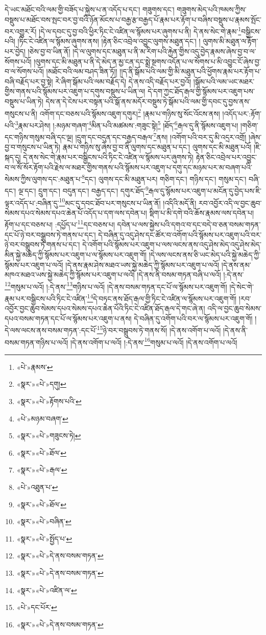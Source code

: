 དེ་ཡང་མཐོང་བའི་ལམ་གྱི་བཟོད་པ་སྐྱེས་པ་ན་འདོད་པ་དང་། གཟུགས་དང་། གཟུགས་མེད་པའི་ཁམས་ཀྱིས་བསྡུས་པ་མཐོང་བས་སྤང་བར་བྱ་བའི་ཉོན་མོངས་པ་བརྒྱ་རྩ་བརྒྱད་པོ་རྣམ་པར་རྟོག་པ་བཞིས་བསྡུས་པ་རྣམས་སྤོང་བར་འགྱུར་རོ། །དེ་ལ་དབང་དུ་བྱ་བའི་ཕྱིར་ཏིང་ངེ་འཛིན་ལ་སྙོམས་པར་ཞུགས་པ་ནི། དེ་ནས་སེང་གེ་རྣམ་\footnote{«པེ་»རྣམས་}བསྒྱིངས་པའི། །ཏིང་ངེ་འཛིན་ལ་སྙོམས་ཞུགས་ནས། །རྟེན་ཅིང་འབྲེལ་འབྱུང་ལུགས་མཐུན་དང་། །
ལུགས་མི་མཐུན་ལ་རྟོག་པར་བྱེད། །ཅེས་བྱ་བ་ཡིན་ནོ། །དེ་ལ་ལུགས་དང་མཐུན་པ་ནི་མ་རིག་པའི་རྐྱེན་གྱིས་འདུ་བྱེད་རྣམས་ཞེས་བྱ་བ་ལ་སོགས་པའོ། །ལུགས་དང་མི་མཐུན་པ་ནི་དེ་མེད་ན་མྱ་ངན་དང་སྨྲེ་སྔགས་འདོན་པ་ལ་སོགས་པ་མི་འབྱུང་ངོ་ཞེས་བྱ་བ་ལ་སོགས་པའོ། །མཐོང་བའི་ལམ་བཤད་ཟིན་ཏོ།། །།ད་ནི་སྒོམ་པའི་ལམ་གྱི་མི་མཐུན་པའི་ཕྱོགས་རྣམ་པར་རྟོག་པ་བཞི་བརྗོད་པར་བྱ་སྟེ། རེ་ཞིག་སྒོམ་པའི་ལམ་བརྗོད་དེ། དེ་ནས་འདི་བརྗོད་པར་བྱའོ། །སྒོམ་པའི་ལམ་ཡང་མཐར་གྱིས་གནས་པའི་སྙོམས་པར་འཇུག་པ་དགུས་བསྡུས་པ་ཡིན་ལ། དེ་དག་ཀྱང་ཐོད་རྒལ་གྱི་སྙོམས་པར་འཇུག་པས་བསྡུས་པ་ཡིན་ཏེ། དེས་ན་དེ་ངེས་པར་བསྟན་པའི་སྒོ་ནས་མདོར་བསྡུས་ཏེ་སྒོམ་པའི་ལམ་གྱི་དབང་དུ་བྱས་ནས་གསུངས་པ་ནི། འགོག་དང་བཅས་པའི་སྙོམས་འཇུག་དགུར།\footnote{«སྣར་»«པེ་»དགུ།} །རྣམ་པ་གཉིས་སུ་སོང་འོངས་ནས། །འདོད་པར་:རྟོག་པའི་\footnote{«སྣར་»«པེ་»རྟོགས་པའི་}རྣམ་པར་ཤེས། །:མཉམ་གཞག་\footnote{«པེ་»མཉམ་བཞག་}མིན་པའི་མཚམས་:གཟུང་སྟེ།\footnote{«སྣར་»«པེ་»གཟུངས་ཏེ།} །ཐོད་\footnote{«སྣར་»«པེ་»ཐོལ་}རྒལ་དུ་ནི་སྙོམས་འཇུག་པ། །གཅིག་དང་གཉིས་གསུམ་བཞི་དང་ལྔ། །དྲུག་དང་བདུན་དང་བརྒྱད་བརྒལ་\footnote{«སྣར་»«པེ་»རྒལ་}ནས། །འགོག་པའི་བར་དུ་མི་འདྲར་འགྲོ། །ཞེས་བྱ་བ་གསུངས་པ་ཡིན་ཏེ། རྣམ་པ་གཉིས་སུ་ཞེས་བྱ་བ་ནི་ལུགས་དང་མཐུན་པ་དང་། ལུགས་དང་མི་མཐུན་པའོ། །ཇི་སྐད་དུ། དེ་ནས་སེང་གེ་རྣམ་པར་བསྒྱིངས་པའི་ཏིང་ངེ་འཛིན་ལ་སྙོམས་པར་ཞུགས་ཏེ། རྟེན་ཅིང་འབྲེལ་པར་འབྱུང་བ་ལ་སོ་སོར་རྟོག་པའི་རྗེས་ལ་མཐར་གྱིས་གནས་པའི་སྙོམས་པར་འཇུག་པ་དགུ་དང་མཉམ་པར་མ་བཞག་པའི་སེམས་ཀྱིས་ལུགས་དང་:མཐུན་པ་\footnote{«པེ་»འཐུན་པ་}དང་། ལུགས་དང་མི་མཐུན་པར། གཅིག་དང་། གཉིས་དང་། གསུམ་དང་། བཞི་དང་། ལྔ་དང་། དྲུག་དང་། བདུན་དང་། བརྒྱད་དང་། དགུར་ཐོད་\footnote{«སྣར་»«པེ་»ཐོལ་}རྒལ་དུ་སྙོམས་པར་འཇུག་པ་མངོན་དུ་བྱེད་པས་ཇི་ལྟར་འདོད་པ་:བཞིན་དུ་\footnote{«སྣར་»«པེ་»བཞིན་}མང་དུ་དབང་ཐོབ་པར་གསུངས་པ་ཡིན་ནོ། །འདིའི་མདོ་ནི། རབ་འབྱོར་འདི་ལ་བྱང་ཆུབ་སེམས་དཔའ་སེམས་དཔའ་ཆེན་པོ་འདོད་པ་དག་ལས་དབེན་པ། སྡིག་པ་མི་དགེ་བའི་ཆོས་རྣམས་ལས་དབེན་པ། རྟོག་པ་དང་བཅས་པ། :དཔྱོད་པ་\footnote{«སྣར་»«པེ་»སྤྱོད་པ་}དང་བཅས་པ། དབེན་པ་ལས་སྐྱེས་པའི་དགའ་བ་དང་བདེ་བ་ཅན་བསམ་གཏན་དང་པོ་ཉེ་བར་བསྒྲུབས་ཏེ་གནས་པ་དང་། དེ་བཞིན་དུ་འདུ་ཤེས་དང་ཚོར་བ་འགོག་པའི་སྙོམས་པར་འཇུག་པའི་བར་ཉེ་བར་བསྒྲུབས་ཏེ་གནས་པ་དང་། དེ་འགོག་པའི་སྙོམས་པར་འཇུག་པ་ལས་ལངས་ནས་འདུ་ཤེས་མེད་འདུ་ཤེས་མེད་མིན་སྐྱེ་མཆེད་ཀྱི་སྙོམས་པར་འཇུག་པ་ལ་སྙོམས་པར་འཇུག་གོ། །དེ་ལས་ལངས་ནས་ཅི་ཡང་མེད་པའི་སྐྱེ་མཆེད་ཀྱི་སྙོམས་པར་འཇུག་པ་ལའོ། །དེ་ནས་རྣམ་ཤེས་མཐའ་ཡས་སྐྱེ་མཆེད་ཀྱི་སྙོམས་པར་འཇུག་པ་ལའོ། །དེ་ནས་ནམ་མཁའ་མཐའ་ཡས་སྐྱེ་མཆེད་ཀྱི་སྙོམས་པར་འཇུག་པ་ལའོ། །དེ་ནས་ནི་བསམ་གཏན་བཞི་པ་ལའོ། །:དེ་ནས་\footnote{«སྣར་»«པེ་»དེ་ནས་བསམ་གཏན་}གསུམ་པ་ལའོ། །:དེ་ནས་\footnote{«སྣར་»«པེ་»དེ་ནས་བསམ་གཏན་}གཉིས་པ་ལའོ། །དེ་ནས་བསམ་གཏན་དང་པོ་ལ་སྙོམས་པར་འཇུག་གོ། །དེ་སེང་གེ་རྣམ་པར་བསྒྱིངས་པའི་ཏིང་ངེ་འཛིན་\footnote{«སྣར་»«པེ་»འཛིན་ལ་}དེ་བཏང་ནས་ཐོད་རྒལ་གྱི་ཏིང་ངེ་འཛིན་ལ་སྙོམས་པར་འཇུག་གོ། །རབ་འབྱོར་བྱང་ཆུབ་སེམས་དཔའ་སེམས་དཔའ་ཆེན་པོའི་ཏིང་ངེ་འཛིན་ཐོད་རྒལ་དེ་གང་ཞེ་ན། འདི་ལ་བྱང་ཆུབ་སེམས་དཔའ་བསམ་གཏན་དང་པོ་ལ་སྙོམས་པར་འཇུག་པ་ནས། དེ་བཞིན་དུ་འགོག་པའི་བར་ལ་སྙོམས་པར་འཇུག་གོ། །དེ་ལས་ལངས་ནས་བསམ་གཏན་:དང་པོ་\footnote{«པེ་»དང་པོར་}ཉེ་བར་བསྒྲུབས་ཏེ་གནས་སོ། །དེ་ནས་འགོག་པ་ལའོ། །དེ་ནས་ནི་བསམ་གཏན་གཉིས་པ་ལའོ། །དེ་ནས་འགོག་པ་ལའོ། །:དེ་ནས་\footnote{«སྣར་»«པེ་»དེ་ནས་བསམ་གཏན་}གསུམ་པ་ལའོ། །དེ་ནས་འགོག་པ་ལའོ། 